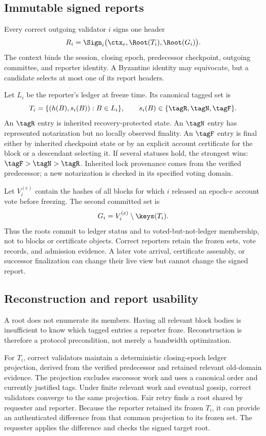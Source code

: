 \subsection{Immutable signed reports}
Every correct outgoing validator $i$ signs one header
\[
R_i=\Sign_i\bigl(\ctx_e,\Root(T_i),\Root(G_i)\bigr).
\]
The context binds the session, closing epoch, predecessor checkpoint, outgoing committee, and reporter identity. A Byzantine identity may equivocate, but a candidate selects at most one of its report headers.

Let $L_i$ be the reporter's ledger at freeze time. Its canonical tagged set is
\[
T_i=\{(h(B),s_i(B)):B\in L_i\},\qquad s_i(B)\in\{\tagR,\tagN,\tagF\}.
\]
An $\tagR$ entry is inherited recovery-protected state. An $\tagN$ entry has represented notarization but no locally observed finality. An $\tagF$ entry is final either by inherited checkpoint state or by an explicit account certificate for the block or a descendant selecting it. If several statuses hold, the strongest wins: $\tagF>\tagN>\tagR$. Inherited lock provenance comes from the verified predecessor; a new notarization is checked in its specified voting domain.

Let $V_i^{(e)}$ contain the hashes of all blocks for which $i$ released an epoch-$e$ account vote before freezing. The second committed set is
\[
G_i=V_i^{(e)}\setminus\keys(T_i).
\]
Thus the roots commit to ledger status and to voted-but-not-ledger membership, not to blocks or certificate objects. Correct reporters retain the frozen sets, vote records, and admission evidence. A later vote arrival, certificate assembly, or successor finalization can change their live view but cannot change the signed report.

\subsection{Reconstruction and report usability}
A root does not enumerate its members. Having all relevant block bodies is insufficient to know which tagged entries a reporter froze. Reconstruction is therefore a protocol precondition, not merely a bandwidth optimization.

For $T_i$, correct validators maintain a deterministic closing-epoch ledger projection, derived from the verified predecessor and retained relevant old-domain evidence. The projection excludes successor work and uses a canonical order and currently justified tags. Under finite relevant work and eventual gossip, correct validators converge to the same projection. Fair retry finds a root shared by requester and reporter. Because the reporter retained its frozen $T_i$, it can provide an authenticated difference from that common projection to its frozen set. The requester applies the difference and checks the signed target root.

